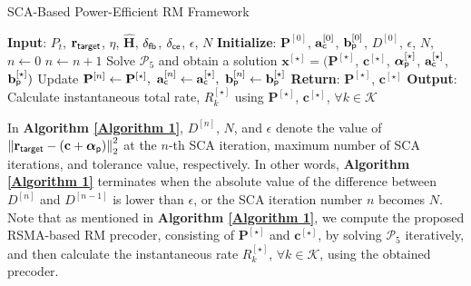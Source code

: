 \documentclass[draftclsnofoot, onecolumn, comsoc, 12pt]{IEEEtran}
\begin{document}
\begin{algorithm}[!t]
\caption{SCA-Based Power-Efficient RM Framework}\label{Algorithm 1}
\begin{algorithmic}
\State \textbf{Input}: $P_{t}$, $\mathbf{r}_{\sf{target}}$, $\eta$, $\hat{\mathbf{H}}$, $\delta_{\sf{fb}}$, $\delta_{\sf{ce}}$, $\epsilon$, $N$
\State \textbf{Initialize}: $\mathbf{P}^{[0]}$, $\mathbf{a}_{{\sf{c}}}^{[0]}$, $\mathbf{b}_{{\sf{p}}}^{[0]}$, $D^{[0]}$, $\epsilon$, $N$, $n \leftarrow 0$
\Repeat
      \State $n \leftarrow n+1$ 
      \State Solve $\mathscr{P}_5$ and obtain a solution $\mathbf{x}^{[\star]} = (\mathbf{P}^{[\star]}$, $\mathbf{c}^{[\star]}$, $\boldsymbol{\alpha}_{{\sf{p}}}^{[\star]}$, $\mathbf{a}_{{\sf{c}}}^{[\star]}$, $\mathbf{b}_{{\sf{p}}}^{[\star]})$
      \State Update  $\mathbf{P}^{[n]} \leftarrow \mathbf{P}^{[\star]}, \,\, \mathbf{a}_{{\sf{c}}}^{[n]} \leftarrow \mathbf{a}_{{\sf{c}}}^{[\star]}, \,\, \mathbf{b}_{{\sf{p}}}^{[n]} \leftarrow \mathbf{b}_{{\sf{p}}}^{[\star]}$
\State \textbf{Return}: $\mathbf{P}^{[\star]}$, $\mathbf{c}^{[\star]}$
\State \textbf{Output}: Calculate instantaneous total rate, $R_{k}^{[\star]}$ using $\mathbf{P}^{[\star]}$, $\mathbf{c}^{[\star]}$, $ \forall k \in \mathcal{K}$
\end{algorithmic}
\end{algorithm}
In \textbf{Algorithm \ref{Algorithm 1}}, $D^{[n]}$, $N$, and $\epsilon$ denote the value of ${\Vert \mathbf{r}_{\sf{target}}-(\mathbf{c} + \boldsymbol{\alpha}_{\sf{p}}) \Vert}_{2}^2$ at the $n$-th SCA iteration, maximum number of SCA iterations, and tolerance value, respectively. 
In other words, \textbf{Algorithm \ref{Algorithm 1}} terminates when the absolute value of the difference between $D^{[n]}$ and $D^{[n-1]}$ is lower than $\epsilon$, or the SCA iteration number $n$ becomes $N$. 
Note that as mentioned in \textbf{Algorithm \ref{Algorithm 1}}, we compute the proposed RSMA-based RM precoder, consisting of $\mathbf{P}^{[\star]}$ and $\mathbf{c}^{[\star]}$, by solving $\mathscr{P}_{5}$ iteratively, and then calculate the instantaneous rate $R_{k}^{[\star]}$, $ \forall k \in \mathcal{K}$, using the obtained precoder. 
\end{document}

